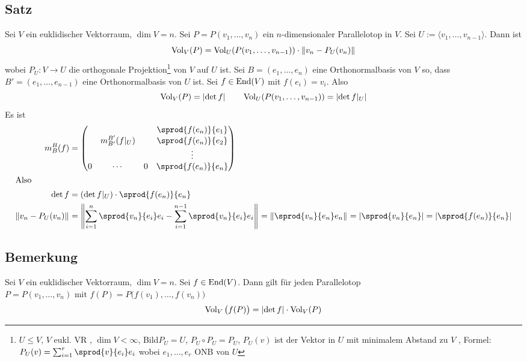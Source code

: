 \subsection[Satz über das Volumen in einem Unterraum]{Satz} %
\label{sub:28}
Sei $V$ ein euklidischer Vektorraum, $\dim V =n$. Sei $P=P(v_1, \ldots , v_n)$ ein $n$-dimensionaler Parallelotop in $V$. Sei $U:= \langle v_1, \ldots , v_{n-1} \rangle$.
Dann ist
\[
	\vol{V} \enbrace{P} = \Vol_U \enbrace{P(v_1, \ldots , v_{n-1})} \cdot \norm[]{v_n - P_U(v_n)}   
\]
wobei $P_U : V \to U$ die orthogonale Projektion\footnote{$U \le V$, $V$ eukl. VR , $\dim V < \infty$, Bild$P_U = U$, $P_U \circ P_U = P_U$,  $P_U (v)$ ist der Vektor in $U$ mit minimalem Abstand zu $V$ , Formel: $P_U (v) = \sum_{i=1}^{r} \sprod{v}{e_i} e_i$ wobei $e_1, \ldots , e_r$ ONB von $U$} von $V$ auf $U$ ist. 
Sei $B= (e_1, \ldots , e_n)$ eine Orthonormalbasis von $V$ so, dass $B'=(e_1, \ldots , e_{n-1})$ eine Orthonormalbasis von $U$ ist. Sei $f \in \operatorname{End}(V)$ mit 
$f(e_i)=v_i$. Also
\[
	\operatorname{Vol}_{V} (P) = \lvert\det f\rvert \qquad \operatorname{Vol}_{U} (P(v_1, \ldots , v_{n-1})) = \lvert\det f|_{U}\rvert   
\]
Es ist
\begin{align*}
	m_B^B (f) &= {\begin{pmatrix}
		& & & \sprod{f(e_n)}{e_1} \\
		& m_{B'}^{B'}(f|_U) & & \sprod{f(e_n)}{e_2} \\
		& & & \vdots  \\
		0 & \cdots & 0 & \sprod{f(e_n)}{e_n}   
	\end{pmatrix}} \\
	\intertext{Also}
	\det f &= (\det f|_U) \cdot  \sprod{f (e_n)}{e_n} \\
	\norm[]{v_n - P_U(v_n)} &= \norm[]{\sum_{i=1}^{n} \sprod{v_n}{e_i} e_i - \sum_{i=1}^{n-1} \sprod{v_n }{e_i} e_i   } 
	= \norm[]{\sprod{v_n}{e_n} e_n} = \abs{\sprod{v_n}{e_n} } = \abs{\sprod{f (e_n)}{e_n}}    
\end{align*}


\subsection[Bemerkung über das Volumen eines Parallelotops unter einem Endomorphismus]{Bemerkung} %
\label{sub:29}
Sei $V$ ein euklidischer Vektorraum, $\dim V = n$. Sei $f \in \operatorname{End}(V)$. Dann gilt für jeden Parallelotop 
$P=P(v_1, \ldots , v_n) \text{ mit } f(P) = P\big(f(v_1), \ldots , f(v_n)\big)$
\[
	\operatorname{Vol}_{V} \big(f(P)\big) = \lvert\det f\rvert \cdot \operatorname{Vol}_{V}(P)  
\]
\newpage
